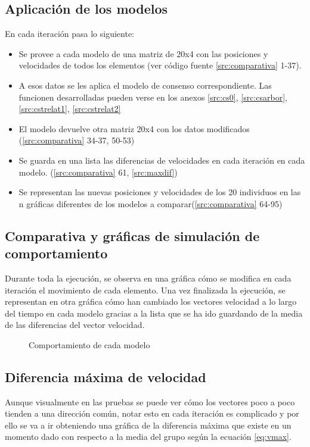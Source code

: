 \subsection{Aplicación de los modelos}\label{s4_2_2}
En cada iteración pasa lo siguiente:
\begin{itemize}
    \item Se provee a cada modelo de una matriz de 20x4 con las posiciones y velocidades de todos los elementos (ver código fuente \ref{src:comparativa} 1-37).
    \item A esos datos se les aplica el modelo de consenso correspondiente. Las funcionen desarrolladas pueden verse en los anexos \ref{src:cs0}, \ref{src:csarbor}, \ref{src:cstrelat1}, \ref{src:cstrelat2}
    \item El modelo devuelve otra matriz 20x4 con los datos modificados (\ref{src:comparativa} 34-37, 50-53)
    \item Se guarda en una lista las diferencias de velocidades en cada iteración en cada modelo. (\ref{src:comparativa} 61, \ref{src:maxdif})
    \item Se representan las nuevas posiciones y velocidades de los 20 individuos en las n gráficas diferentes de los modelos a comparar(\ref{src:comparativa} 64-95)
\end{itemize}

\subsection{Comparativa y gráficas de simulación de comportamiento}\label{s4_2_3}
Durante toda la ejecución, se observa en una gráfica cómo se modifica en cada iteración el movimiento de cada elemento. 
Una vez finalizada la ejecución, se representan en otra gráfica cómo han cambiado los vectores velocidad a lo largo del tiempo en cada modelo gracias a la lista que se ha ido guardando de la media de las diferencias del vector velocidad. 

\begin{figure}[h]
  \centering
    
  \caption{Comportamiento de cada modelo}
\end{figure}

\subsection{Diferencia máxima de velocidad}\label{s4_2_4}
Aunque visualmente en las pruebas se puede ver cómo los vectores poco a poco tienden a una dirección común, notar esto en cada iteración es complicado y por ello se va a ir obteniendo una gráfica de la diferencia máxima que existe en un momento dado con respecto a la media del grupo según la ecuación \ref{eq:vmax}.

